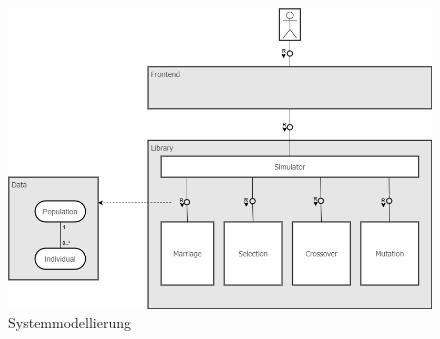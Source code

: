\begin{figure}[H]
\centering
\includegraphics[width=1\textwidth]{img/Vortrag/Systemmodellierung.png}
\caption{Systemmodellierung}
\label{fig:systemmodellierung}
\end{figure}

